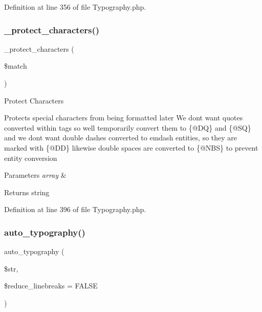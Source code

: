 Definition at line 356 of file Typography.\+php.

\mbox{\label{class_c_i___typography_a03e8f97de4301e0fe0cf0e9f0bcd936c}} 
\subsubsection{\texorpdfstring{\_protect\_characters()}{\_protect\_characters()}}
{\footnotesize\ttfamily \+\_\+protect\+\_\+characters (\begin{DoxyParamCaption}\item[{}]{\$match }\end{DoxyParamCaption})\hspace{0.3cm}{\ttfamily [protected]}}

Protect Characters

Protects special characters from being formatted later We don\textquotesingle{}t want quotes converted within tags so we\textquotesingle{}ll temporarily convert them to \{@\+DQ\} and \{@\+SQ\} and we don\textquotesingle{}t want double dashes converted to emdash entities, so they are marked with \{@\+DD\} likewise double spaces are converted to \{@\+N\+BS\} to prevent entity conversion


\begin{DoxyParams}{Parameters}
{\em array} & \\
\hline
\end{DoxyParams}
\begin{DoxyReturn}{Returns}
string 
\end{DoxyReturn}


Definition at line 396 of file Typography.\+php.

\mbox{\label{class_c_i___typography_a24c284b560f34d6c7fad07e36baaa024}} 
\subsubsection{\texorpdfstring{auto\_typography()}{auto\_typography()}}
{\footnotesize\ttfamily auto\+\_\+typography (\begin{DoxyParamCaption}\item[{}]{\$str,  }\item[{}]{\$reduce\+\_\+linebreaks = {\ttfamily FALSE} }\end{DoxyParamCaption})}

